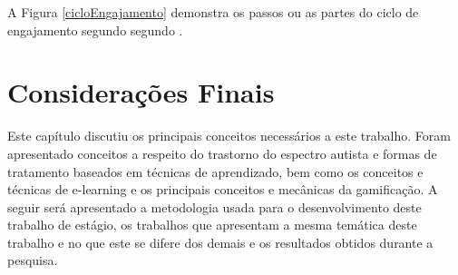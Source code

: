 		A Figura \ref{cicloEngajamento} demonstra os passos ou as partes do ciclo de engajamento segundo segundo .
		
\section{Considerações Finais}
Este capítulo discutiu os principais conceitos necessários a este trabalho. Foram apresentado conceitos a respeito do trastorno do espectro autista e formas de tratamento baseados em técnicas de aprendizado, bem como os conceitos e técnicas de e-learning e os principais conceitos e mecânicas da gamificação. A seguir será apresentado a metodologia usada para o desenvolvimento deste trabalho de estágio,  os trabalhos que apresentam a mesma temática deste trabalho e no que este se difere dos demais e os resultados obtidos durante a pesquisa.
